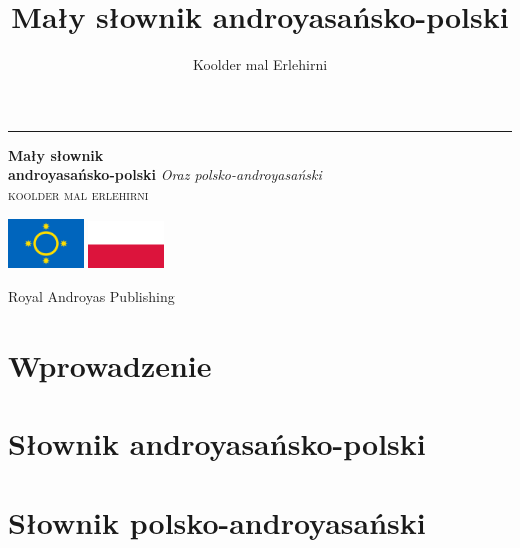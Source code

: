 \documentclass[openany, twoside, b5paper]{book}
\begin{document}
\author{Koolder mal Erlehirni}
\title{Mały słownik androyasańsko-polski}

\frontmatter

\begin{titlepage} %
    \newcommand*{\plogo}{\fbox{$\mathcal{AND}$}} %
    
	\raggedleft %
	
	\rule{1pt}{\textheight} %
	\hspace{0.05\textwidth} %
	\parbox[b]{0.75\textwidth}{ %
		
        {\Huge\bfseries Mały słownik\\ androyasańsko-polski}
        {\large\textit{Oraz polsko-androyasański}}\\[4\baselineskip]
		{\Large\textsc{koolder mal erlehirni}} %
        
        \bigskip

        \includegraphics[width=2cm]{androyas-flag}
        \includegraphics[width=2cm]{pl-flag}

        \vspace{0.5\textheight} %
		
		{\noindent Royal Androyas Publishing~~\plogo}\\[\baselineskip] %
	}

\end{titlepage}

\clearpage


\tableofcontents

\mainmatter
\chapter{Wprowadzenie}




\chapter{Słownik androyasańsko-polski}


\chapter{Słownik polsko-androyasański}


\backmatter
\end{document}
